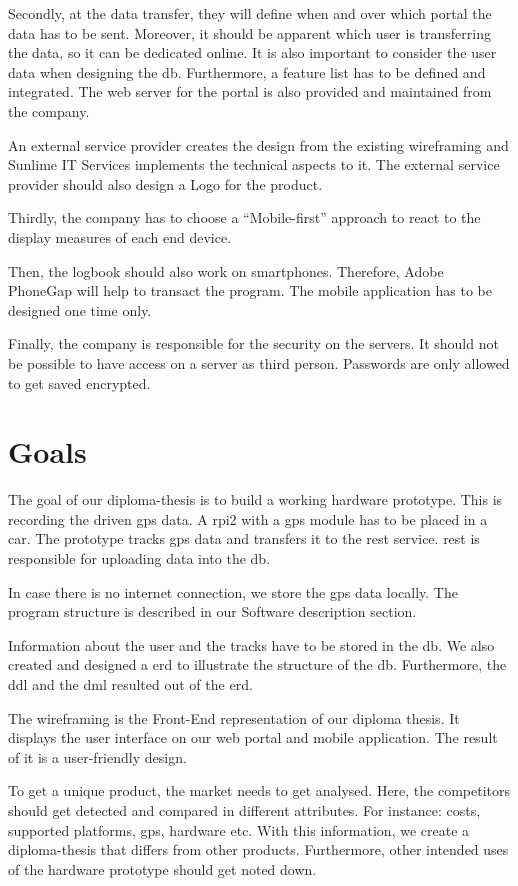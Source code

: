 Secondly, at the data transfer, they will define when and over which portal the data has to be sent. Moreover, it should be apparent which user is transferring the data, so it can be dedicated online. It is also important to consider the user data when designing the \gls{db}. Furthermore, a feature list has to be defined and integrated.
The web server for the portal is also provided and maintained from the company.

An external service provider creates the design from the existing wireframing and Sunlime IT Services implements the technical aspects to it. The external service provider should also design a Logo for the product.

Thirdly, the company has to choose a “Mobile-first” approach to react to the display measures of each end device.

Then, the logbook should also work on smartphones. Therefore, Adobe PhoneGap will help to transact the program. The mobile application has to be designed one time only.

Finally, the company is responsible for the security on the servers. It should not be possible to have access on a server as third person. Passwords are only allowed to get saved encrypted.
\newpage
\section*{Goals}
The goal of our diploma-thesis is to build a working hardware prototype. This is recording the driven \gls{gps} data. A \gls{rpi2} with a \gls{gps} module has to be placed in a car. The prototype tracks \gls{gps} data and transfers it to the \gls{rest} service. \gls{rest} is responsible for uploading data into the \gls{db}. 

In case there is no internet connection, we store the \gls{gps} data locally. The program structure is described in our Software description section.

Information about the user and the tracks have to be stored in the \gls{db}. We also created and designed a \gls{erd} to illustrate the structure of the \gls{db}. Furthermore, the \gls{ddl} and the \gls{dml} resulted out of the \gls{erd}.

The wireframing is the Front-End representation of our diploma thesis. It displays the user interface on our web portal and mobile application. The result of it is a user-friendly design.

To get a unique product, the market needs to get analysed. Here, the competitors should get detected and compared in different attributes. For instance: costs, supported platforms, \gls{gps}, hardware etc. With this information, we create a diploma-thesis that differs from other products. Furthermore, other intended uses of the hardware prototype should get noted down.

